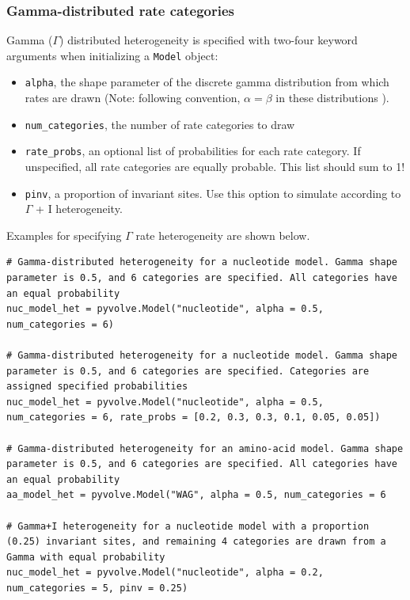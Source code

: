 \documentclass{article}
\newcommand{\code}[1]{\texttt{\small{#1}}}
\begin{document}
\subsubsection{Gamma-distributed rate categories}

Gamma ($\Gamma$) distributed heterogeneity is specified with two-four keyword arguments when initializing a \code{Model} object:
\begin{itemize}
	\item \code{alpha}, the shape parameter of the discrete gamma distribution from which rates are drawn (Note: following convention, $\alpha = \beta$ in these distributions \citep{Yang2006}).
	\item \code{num\_categories}, the number of rate categories to draw
	\item \code{rate\_probs}, an optional list of probabilities for each rate category. If unspecified, all rate categories are equally probable. This list should sum to 1!
	\item \code{pinv}, a proportion of invariant sites. Use this option to simulate according to $\Gamma$ + I heterogeneity.
\end{itemize}

Examples for specifying $\Gamma$ rate heterogeneity are shown below.

\begin{lstlisting}
# Gamma-distributed heterogeneity for a nucleotide model. Gamma shape parameter is 0.5, and 6 categories are specified. All categories have an equal probability
nuc_model_het = pyvolve.Model("nucleotide", alpha = 0.5, num_categories = 6)

# Gamma-distributed heterogeneity for a nucleotide model. Gamma shape parameter is 0.5, and 6 categories are specified. Categories are assigned specified probabilities
nuc_model_het = pyvolve.Model("nucleotide", alpha = 0.5, num_categories = 6, rate_probs = [0.2, 0.3, 0.3, 0.1, 0.05, 0.05])

# Gamma-distributed heterogeneity for an amino-acid model. Gamma shape parameter is 0.5, and 6 categories are specified. All categories have an equal probability
aa_model_het = pyvolve.Model("WAG", alpha = 0.5, num_categories = 6

# Gamma+I heterogeneity for a nucleotide model with a proportion (0.25) invariant sites, and remaining 4 categories are drawn from a Gamma with equal probability
nuc_model_het = pyvolve.Model("nucleotide", alpha = 0.2, num_categories = 5, pinv = 0.25)
\end{lstlisting}
\end{document}
